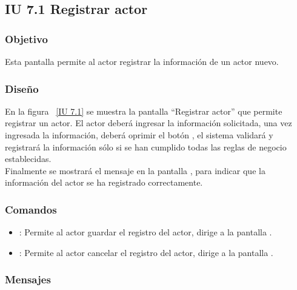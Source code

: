 \newpage 
\subsection{IU 7.1 Registrar actor}

\subsubsection{Objetivo}
	
	Esta pantalla permite al actor registrar la información de un actor nuevo.

\subsubsection{Diseño}

    En la figura ~\ref{IU 7.1} se muestra la pantalla ``Registrar actor'' que permite registrar un actor. El actor deberá ingresar la información solicitada, 
    una vez ingresada la información, deberá oprimir el botón 
    , el sistema validará y registrará la información sólo si se han cumplido todas las reglas de negocio establecidas.  \\
    
    Finalmente se mostrará el mensaje  en la pantalla , para indicar que la información del actor
    se ha registrado correctamente.        



\subsubsection{Comandos}
\begin{itemize}
	\item {}: Permite al actor guardar el registro del actor, dirige a la pantalla .
	\item {}: Permite al actor cancelar el registro del actor, dirige a la pantalla .
\end{itemize}

\subsubsection{Mensajes}


